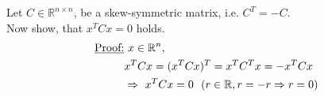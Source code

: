 {\color{solution}
Let $C\in\mathbb{R}^{n\times n}$, be a skew-symmetric matrix, i.e. $C^T = -C$.\\Now show, that $x^TCx=0$ holds.
\begin{align*}
\text{\underline{Proof:}}&~x\in\mathbb{R}^n,\\
&x^TCx=(x^TCx)^T=x^TC^Tx=-x^TCx\\
&\Rightarrow~x^TCx=0~~(r\in\mathbb{R},r=-r\Rightarrow r=0)
\end{align*}
}